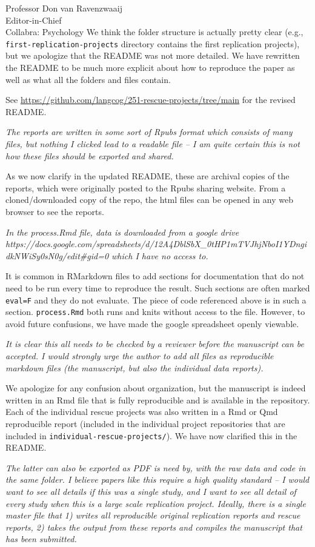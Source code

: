 \documentclass{stanfordletter}
\newcounter{section}
\newcommand{\theysaid}[1]{\begin{leftbar} \noindent 
		\textsl{ #1}\end{leftbar}}
\begin{document}
\begin{letter}{Professor Don van Ravenzwaaij \\ Editor-in-Chief \\ Collabra: Psychology }
	We think the folder structure is actually pretty clear (e.g., \texttt{first-replication-projects} directory contains the first replication projects), but we apologize that the README was not more detailed. We have rewritten the README to be much more explicit about how to reproduce the paper as well as what all the folders and files contain.
	
	See  \url{https://github.com/langcog/251-rescue-projects/tree/main} for the revised README.
	
	
	\theysaid{The reports are written in some sort of Rpubs format which consists of many files, but nothing I clicked lead to a readable file – I am quite certain this is not how these files should be exported and shared.}
	
	As we now clarify in the updated README, these are archival copies of the reports, which were originally posted to the Rpubs sharing website. From a cloned/downloaded copy of the repo, the html files can be opened in any web browser to see the reports.
	
	
	\theysaid{In the process.Rmd file, data is downloaded from a google drive https://docs.google.com/spreadsheets/d/12A4DblSbX\_0tHP1mTVJhjNboI1YDngidkNWiSy0sN0g/edit\#gid=0 which I have no access to. }
	
	It is common in RMarkdown files to add sections for documentation that do not need to be run every time to reproduce the result. Such sections are often marked \texttt{eval=F} and they do not evaluate. The piece of code referenced above is in such a section. \texttt{process.Rmd} both runs and knits without access to the file. However, to avoid future confusions, we have made the google spreadsheet openly viewable. 
	
	\theysaid{It is clear this all needs to be checked by a reviewer before the manuscript can be accepted. I would strongly urge the author to add all files as reproducible markdown files (the manuscript, but also the individual data reports).}
	
	We apologize for any confusion about organization, but the manuscript is indeed written in an Rmd file that is fully  reproducible and is available in the repository. Each of the individual rescue projects was also written in a Rmd or Qmd reproducible report (included in the individual project repositories that are included in \texttt{individual-rescue-projects/}). We have now clarified this in the README. 
	
	
	\theysaid{ The latter can also be exported as PDF is need by, with the raw data and code in the same folder. I believe papers like this require a high quality standard – I would want to see all details if this was a single study, and I want to see all detail of every study when this is a large scale replication project. Ideally, there is a single master file that 1) writes all reproducible original replication reports and rescue reports, 2) takes the output from these reports and compiles the manuscript that has been submitted.}
	

\end{letter}
\end{document}
